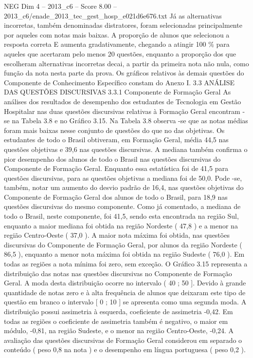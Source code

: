 \begin{textsample}{NEG Dim 4 – 2013\_c6 – Score 8.00 – 2013\_c6/enade\_2013\_tec\_gest\_hosp\_e021d6e676.txt}
Já as alternativas incorretas, também denominadas distratores, foram selecionadas principalmente por aqueles com notas mais baixas.
A proporção de alunos que selecionou a resposta correta E aumenta gradativamente, chegando a atingir 100 \% para aqueles que acertaram pelo menos 20 questões, enquanto a proporção dos que escolheram alternativas incorretas decai, a partir da primeira nota não nula, como função da nota nesta parte da prova.
Os gráficos relativos às demais questões do Componente de Conhecimento Específico constam do Anexo I. 3.3 ANÁLISE DAS QUESTÕES DISCURSIVAS 3.3.1 Componente de Formação Geral As análises dos resultados de desempenho dos estudantes de Tecnologia em Gestão Hospitalar nas duas questões discursivas relativas à Formação Geral encontram -se na Tabela 3.8 e no Gráfico 3.15.
Na Tabela 3.8 observa -se que as notas médias foram mais baixas nesse conjunto de questões do que no das objetivas.
Os estudantes de todo o Brasil obtiveram, em Formação Geral, média 44,5 nas questões objetivas e 39,6 nas questões discursivas.
A mediana também confirma o pior desempenho dos alunos de todo o Brasil nas questões discursivas do Componente de Formação Geral.
Enquanto essa estatística foi de 41,5 para questões discursivas, para as questões objetivas a mediana foi de 50,0.
Pode -se, também, notar um aumento do desvio padrão de 16,4, nas questões objetivas do Componente de Formação Geral dos alunos de todo o Brasil, para 18,9 nas questões discursivas do mesmo componente.
Como já comentado, a mediana de todo o Brasil, neste componente, foi 41,5, sendo esta encontrada na região Sul, enquanto a maior mediana foi obtida na região Nordeste ( 47,8 ) e a menor na região Centro-Oeste ( 37,0 ).
A maior nota máxima foi obtida, nas questões discursivas do Componente de Formação Geral, por alunos da região Nordeste ( 86,5 ), enquanto a menor nota máxima foi obtida na região Sudeste ( 76,0 ).
Em todas as regiões a nota mínima foi zero, sem exceção.
O Gráfico 3.15 representa a distribuição das notas nas questões discursivas no Componente de Formação Geral.
A moda desta distribuição ocorre no intervalo ( 40 ; 50 ].
Devido à grande quantidade de notas zero e à alta frequência de alunos que deixaram este tipo de questão em branco o intervalo [ 0 ; 10 ] se apresenta como uma segunda moda.
A distribuição possui assimetria à esquerda, coeficiente de assimetria -0,42.
Em todas as regiões o coeficiente de assimetria também é negativo, o maior em módulo, -0,81, na região Sudeste, e o menor na região Centro-Oeste, -0,24.
A avaliação das questões discursivas de Formação Geral considerou em separado o conteúdo ( peso 0,8 na nota ) e o desempenho em língua portuguesa ( peso 0,2 ).

\end{textsample}
